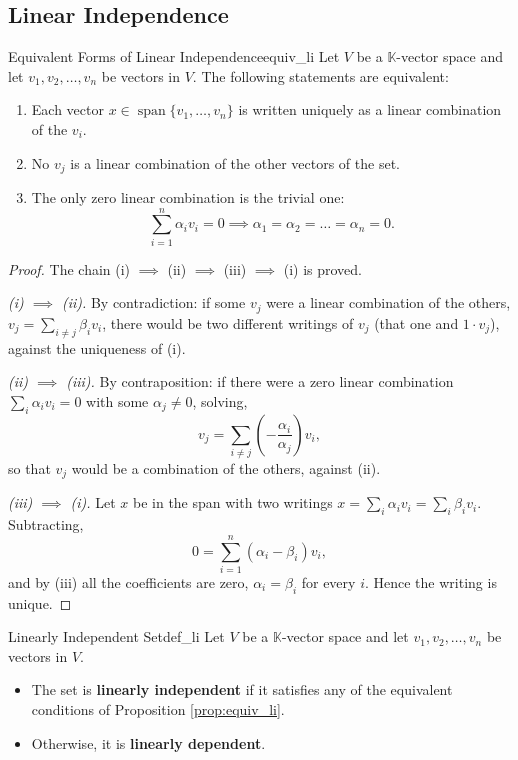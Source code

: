 \documentclass[11pt, a4paper]{article}
\begin{document}
\subsection{Linear Independence}

\begin{proposicion}{Equivalent Forms of Linear Independence}{equiv_li}
Let $V$ be a $\mathbb{K}$-vector space and let $v_1, v_2, \dots, v_n$ be vectors in $V$. The following statements are equivalent:
\begin{enumerate}[label=(\roman*)] %
    \item Each vector $x \in \operatorname{span}\{v_1, \dots, v_n\}$ is written uniquely as a linear combination of the $v_i$.
    \item No $v_j$ is a linear combination of the other vectors of the set.
    \item The only zero linear combination is the trivial one:
    \[
    \sum_{i=1}^{n} \alpha_i v_i = 0 \implies \alpha_1 = \alpha_2 = \dots = \alpha_n = 0.
    \]
\end{enumerate}
\end{proposicion}

\begin{proof}
The chain (i) $\implies$ (ii) $\implies$ (iii) $\implies$ (i) is proved.

\textit{(i) $\implies$ (ii).} By contradiction: if some $v_j$ were a linear combination of the others, $v_j = \sum_{i \neq j} \beta_i v_i$, there would be two different writings of $v_j$ (that one and $1 \cdot v_j$), against the uniqueness of (i).

\textit{(ii) $\implies$ (iii).} By contraposition: if there were a zero linear combination $\sum_{i} \alpha_i v_i = 0$ with some $\alpha_j \neq 0$, solving,
\[
v_j = \sum_{i \neq j} \left( -\frac{\alpha_i}{\alpha_j} \right) v_i,
\]
so that $v_j$ would be a combination of the others, against (ii).

\textit{(iii) $\implies$ (i).} Let $x$ be in the span with two writings $x = \sum_{i} \alpha_i v_i = \sum_{i} \beta_i v_i$. Subtracting,
\[
0 = \sum_{i=1}^{n} (\alpha_i - \beta_i) v_i,
\]
and by (iii) all the coefficients are zero, $\alpha_i = \beta_i$ for every $i$. Hence the writing is unique.
\end{proof}

\begin{definicion}{Linearly Independent Set}{def_li}
Let $V$ be a $\mathbb{K}$-vector space and let $v_1, v_2, \dots, v_n$ be vectors in $V$.
\begin{itemize}
    \item The set is \textbf{linearly independent} if it satisfies any of the equivalent conditions of Proposition \ref{prop:equiv_li}.
    \item Otherwise, it is \textbf{linearly dependent}.
\end{itemize}
\end{definicion}
\end{document}

